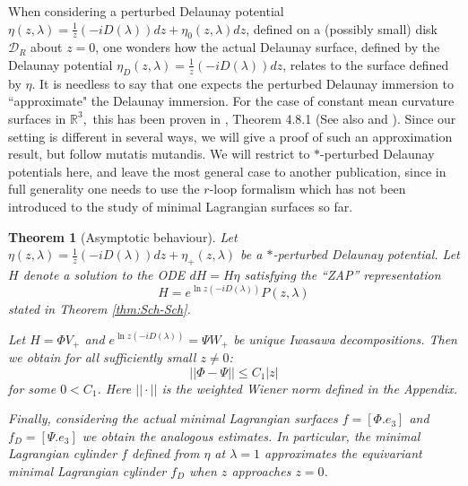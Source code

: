 \documentclass[a4paper,11pt]{amsart}
\newtheorem{theorem}{Theorem}[section]
\theoremstyle{definition}
\numberwithin{equation}{section}
\newcommand{\R}{\mathbb{R}}
\begin{document}
When considering a perturbed Delaunay potential  $\eta(z,\lambda) = \frac{1}{z} (-iD(\lambda)) dz + \eta_0(z,\lambda) dz$, defined on a (possibly small) disk $\mathcal{D}_R$
about $z = 0$, one wonders how the actual Delaunay surface, defined by the  Delaunay potential 
$\eta_D (z, \lambda)=  \frac{1}{z} (-iD(\lambda)) dz$, relates to the surface defined by $\eta$.
 It is needless to say that one expects the perturbed Delaunay immersion to ``approximate" the  Delaunay immersion. For the case of constant mean curvature surfaces in $\R^3,$ this has been proven in 
 \cite{DW08} , Theorem 4.8.1 (See also \cite{KRS} 
 and   \cite{R}).
 Since our setting is different in several ways, we will give a proof of such an approximation result,
 but follow \cite{DW08}  mutatis mutandis. We will restrict to   $*$-perturbed Delaunay potentials 
 here, and leave the most general case to another publication, since in full generality one needs to use 
 the $r$-loop formalism which has not been introduced to the study of minimal Lagrangian surfaces so far.
 
 \begin{theorem}[Asymptotic behaviour]\label{Thm:asymp}
Let $\eta(z,\lambda) = \frac{1}{z} (-iD(\lambda)) dz + \eta_+(z,\lambda)$ be a 
 $*$-perturbed Delaunay potential. 
Let $H$ denote a solution to the ODE $dH = H \eta$ satisfying the  ``ZAP''  representation
$$ H = e^{\ln z (-iD(\lambda))} P(z,\lambda)$$
stated in Theorem \ref{thm:Sch-Sch}. 

Let  $H=\Phi V_+$  and  $e^{\ln z (-iD(\lambda))}=\Psi W_+$    be  unique 
 Iwasawa decompositions. Then we obtain for all sufficiently small $z \neq 0$:
 $$||\Phi-\Psi|| \leq C_1 |z|$$
 for some $0 < C_1$. Here $||\cdot ||$ is the weighted Wiener norm defined in the Appendix.
  
Finally, considering the actual minimal Lagrangian surfaces
$ f = [\Phi.e_3]$ and $f_D = [\Psi.e_3]$ we obtain the analogous estimates. In particular, the minimal Lagrangian cylinder $f$ defined from $\eta$  at $\lambda = 1$ approximates the equivariant minimal Lagrangian cylinder $f_D$ when $z$ approaches $z =0$. 
 \end{theorem}
\end{document}
